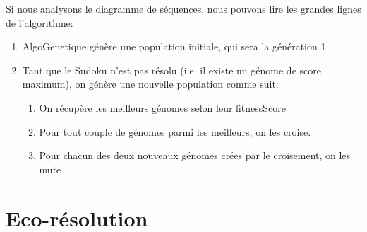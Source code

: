                 Si nous analysons le diagramme de séquences, nous pouvons lire les grandes lignes de l'algorithme:
                \begin{enumerate}
                    \item AlgoGenetique génère une population initiale, qui sera la génération 1.
                    \item Tant que le Sudoku n'est pas résolu (i.e. il existe un génome de score maximum), on génère une nouvelle population comme suit:
                        \begin{enumerate}
                            \item On récupère les meilleurs génomes selon leur fitnessScore
                            \item Pour tout couple de génomes parmi les meilleurs, on les croise.
                            \item Pour chacun des deux nouveaux génomes crées par le croisement, on les mute
                        \end{enumerate}
                \end{enumerate}
    \section{Eco-résolution}
